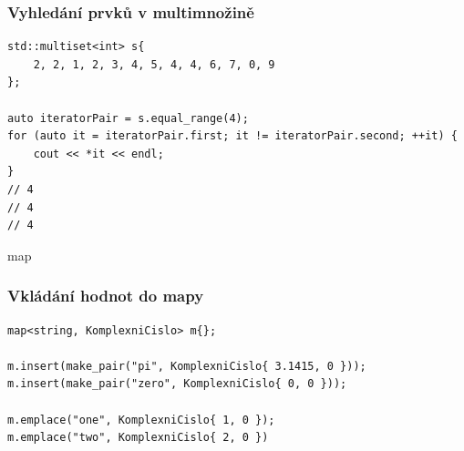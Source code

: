 \begin{frame}[fragile]
\frametitle{Vyhledání prvků v multimnožině}

\begin{yesblock}
\begin{lstlisting}
std::multiset<int> s{
	2, 2, 1, 2, 3, 4, 5, 4, 4, 6, 7, 0, 9
};

auto iteratorPair = s.equal_range(4);
for (auto it = iteratorPair.first; it != iteratorPair.second; ++it) {
	cout << *it << endl;
}
// 4
// 4
// 4
\end{lstlisting}
\end{yesblock}
\end{frame}










\begin{frame}[fragile]
\begin{block}{map}
\end{block}
\end{frame}




\begin{frame}[fragile]
\frametitle{Vkládání hodnot do mapy}
\begin{yesblock}
\begin{lstlisting}
map<string, KomplexniCislo> m{};

m.insert(make_pair("pi", KomplexniCislo{ 3.1415, 0 }));
m.insert(make_pair("zero", KomplexniCislo{ 0, 0 }));

m.emplace("one", KomplexniCislo{ 1, 0 });
m.emplace("two", KomplexniCislo{ 2, 0 })
\end{lstlisting}
\end{yesblock}
\end{frame}




